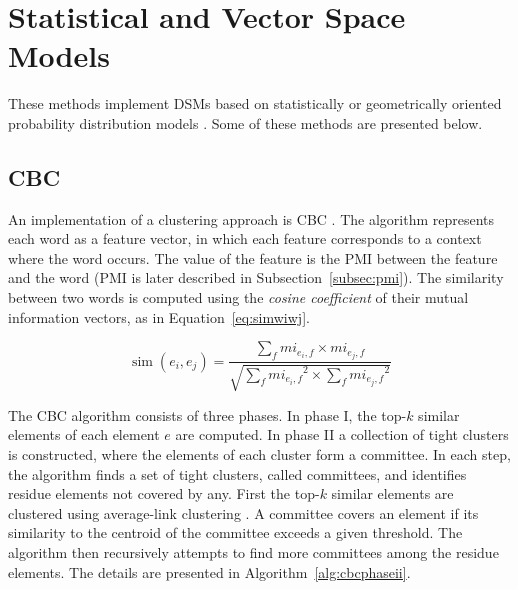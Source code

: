 \section{Statistical and Vector Space Models}
\label{sec:vectorspace}

These methods implement \acp{DSM} based on statistically or geometrically  
oriented probability distribution models \citep{van2010mining}. Some of these 
methods are presented below.

\subsection{\acl*{CBC}}

An implementation of a clustering approach is \ac{CBC} 
\citep{pantel2003clustering}. The algorithm represents each word as a feature 
vector, in which each feature corresponds to a context where the word occurs. 
The value of the feature is the \ac{PMI} between the feature and the word 
\citep{bouma2009normalized} (\ac{PMI} is later described in 
Subsection~\ref{subsec:pmi}). The similarity between two words is computed 
using the \textit{cosine coefficient} \citep{salton1986introduction} of their 
mutual information vectors, as in Equation~\ref{eq:simwiwj}.

\begin{equation}
\operatorname{sim}(e_i,e_j) = \frac{\sum_f mi_{e_i,f} \times mi_{e_j,f}}
                    {\sqrt{\sum_f{mi_{e_i,f}}^2 \times \sum_f{mi_{e_j,f}}^2}}
\label{eq:simwiwj}
\end{equation}

The \ac{CBC} algorithm consists of three phases. In phase I, the top-$k$ 
similar elements of each element $e$ are computed. In phase II a collection of
tight clusters is constructed, where the elements of each cluster form a 
committee. In each step, the algorithm finds a set of tight clusters, called 
committees, and identifies residue elements not covered by any. First the 
top-$k$ similar elements are clustered using average-link clustering 
\citep{han2000data}. A committee covers an element if its similarity to the 
centroid of the committee exceeds a given threshold. The algorithm then 
recursively attempts to find more committees among the residue elements. The 
details are presented in Algorithm~\ref{alg:cbcphaseii}.

